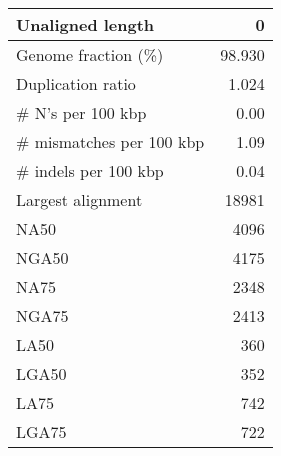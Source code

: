 \documentclass[12pt,a4paper]{article}
\begin{document}
\begin{table}[ht]
\begin{center}
\begin{tabular}{|l*{1}{|r}|}
Unaligned length & 0 \\ \hline
Genome fraction (\%) & 98.930 \\ \hline
Duplication ratio & 1.024 \\ \hline
\# N's per 100 kbp & 0.00 \\ \hline
\# mismatches per 100 kbp & 1.09 \\ \hline
\# indels per 100 kbp & 0.04 \\ \hline
Largest alignment & 18981 \\ \hline
NA50 & 4096 \\ \hline
NGA50 & 4175 \\ \hline
NA75 & 2348 \\ \hline
NGA75 & 2413 \\ \hline
LA50 & 360 \\ \hline
LGA50 & 352 \\ \hline
LA75 & 742 \\ \hline
LGA75 & 722 \\ \hline
\end{tabular}
\end{center}
\end{table}
\end{document}
